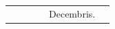 \documentclass[openany]{book}
\renewcommand{\\}{\par\hspace*{.1em}} %
\begin{document}
\begin{center}
\begin{tabular}{l | l | l | r | l l}
& & & & \color{Red} Decembris. \\

\end{tabular}
\end{center}
\end{document}
